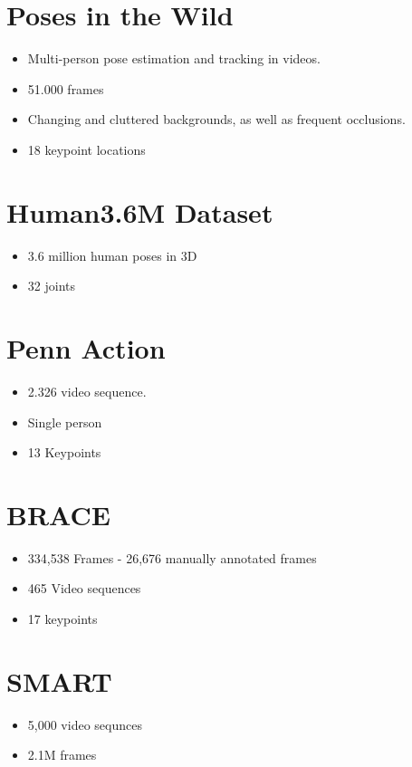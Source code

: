 \documentclass[a4paper]{report}
\begin{document}
\section*{Poses in the Wild}
\begin{itemize}
    \item Multi-person pose estimation and tracking in videos.
    \item 51.000 frames
    \item Changing and cluttered backgrounds, as well as frequent occlusions.
    \item 18 keypoint locations
\end{itemize}

\section*{Human3.6M Dataset}
\begin{itemize}
    \item 3.6 million human poses in 3D
    \item 32 joints
\end{itemize}

\section*{Penn Action}
\begin{itemize}
    \item 2.326 video sequence.
    \item Single person
    \item 13 Keypoints
\end{itemize}

\section*{BRACE}
\begin{itemize}
    \item 334,538 Frames - 26,676 manually annotated frames
    \item 465 Video sequences
    \item 17 keypoints
\end{itemize}

\section*{SMART}
\begin{itemize}
    \item 5,000 video sequnces
    \item 2.1M frames
\end{itemize}
\end{document}
